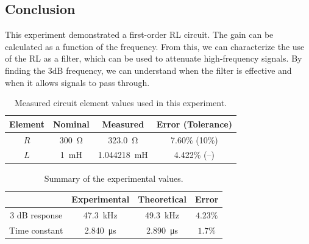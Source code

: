 \documentclass{report}
\begin{document}
\subsection{Conclusion}
This experiment demonstrated a first-order RL circuit. The gain can be calculated as a function of the frequency. From this, we can characterize the use of the RL as a filter, which can be used to attenuate high-frequency signals. By finding the 3dB frequency, we can understand when the filter is effective and when it allows signals to pass through.

\begin{table}[h]
	\centering
	\caption{Measured circuit element values used in this experiment.}
	\begin{threeparttable}
		\label{table:3actual}
		\begin{tabular}{cccc}
			\toprule
			Element & Nominal & Measured & Error (Tolerance) \\
			\midrule
			$R$ & \SI{300}{\ohm} & \SI{323.0}{\ohm} & 7.60\% (10\%) \\
			$L$ & \SI{1}{\milli\henry} & \SI{1.044218}{\milli\henry} & 4.422\% (--) \\
			\bottomrule
		\end{tabular}
	\end{threeparttable}
\end{table}

\begin{table}[h]
	\centering
	\caption{Summary of the experimental values.}
	\begin{threeparttable}
		\label{table:3results}
		\begin{tabular}{cccc}
			\toprule
			& Experimental & Theoretical & Error \\
			\midrule
			3 dB response & \SI{47.3}{\kHz} & \SI{49.3}{\kHz} & $4.23\%$ \\
			Time constant & \SI{2.840}{\us} & \SI{2.890}{\us} & $1.7\%$ \\
			\bottomrule
		\end{tabular}
	\end{threeparttable}
\end{table}
\end{document}
